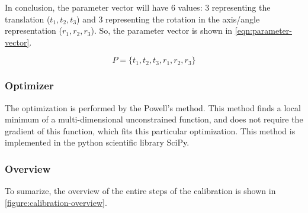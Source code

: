In conclusion, the parameter vector will have 6 values: 3 representing the translation ($t_1, t_2, t_3$) and 3 representing the rotation in the axis/angle representation ($r_1, r_2, r_3$). So, the parameter vector is shown in \cref{eqn:parameter-vector}.

\begin{equation}
    \label{eqn:parameter-vector}
    P = \{t_1, t_2, t_3, r_1, r_2, r_3\}
\end{equation}

\subsubsection{Optimizer}

The optimization is performed by the Powell's method. This method finds a local minimum of a multi-dimensional unconstrained function, and does not require the gradient of this function, which fits this particular optimization. This method is implemented in the python scientific library SciPy.

\subsubsection{Overview}

To sumarize, the overview of the entire steps of the calibration is shown in \cref{figure:calibration-overview}.

